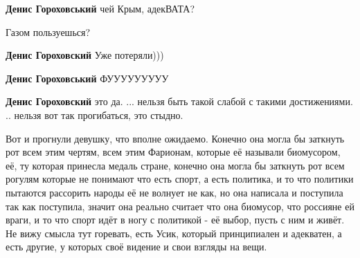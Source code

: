 \begin{itemize}
\begin{itemize}
\textbf{Денис Гороховський} чей Крым, адекВАТА?

 
Газом пользуешься?

 
\textbf{Денис Гороховский} Уже потеряли)))

 
\textbf{Денис Гороховський} ФУУУУУУУУУ

 
\textbf{Денис Гороховский} это да. ... нельзя быть такой слабой с такими достижениями. .. нельзя вот так прогибаться, это стыдно.

\end{itemize}


Вот и прогнули девушку, что вполне ожидаемо. Конечно она могла бы заткнуть рот
всем этим чертям, всем этим Фарионам, которые её называли биомусором, её, ту
которая принесла медаль стране, конечно она могла бы заткнуть рот всем рогулям
которые не понимают что есть спорт, а есть политика, и то что политики пытаются
рассорить народы её не волнует не как, но она написала и поступила так как
поступила, значит она реально считает что она биомусор, что россияне ей враги,
и то что спорт идёт в ногу с политикой - её выбор, пусть с ним и живёт. Не вижу
смысла тут горевать, есть Усик, который принципиален и адекватен, а есть
другие, у которых своё видение и свои взгляды на вещи.

\end{itemize}

